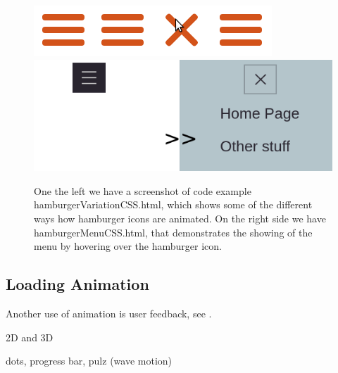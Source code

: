 \begin{figure}[tp]
\centering
\includegraphics[keepaspectratio,scale=0.5]{images/hamburgerVar.png}
\includegraphics[keepaspectratio,scale=0.5]{images/hamburgerMenu.png}

\caption[Hamburger Examples]{
One the left we have a screenshot of code example hamburgerVariationCSS.html, which shows some of the different ways how hamburger icons are animated. On the right side we have hamburgerMenuCSS.html, that demonstrates the showing of the menu by hovering over the hamburger icon.
}
\label{fig:storyboard}
\end{figure}



\label{subsub:menu}


\subsection{Loading Animation} %
\label{sub:loadingCSS}

Another use of animation is user feedback, see .

\label{subsub:rotation_loader}
2D and 3D

\label{subsub:menu}

dots, progress bar, pulz (wave motion)

